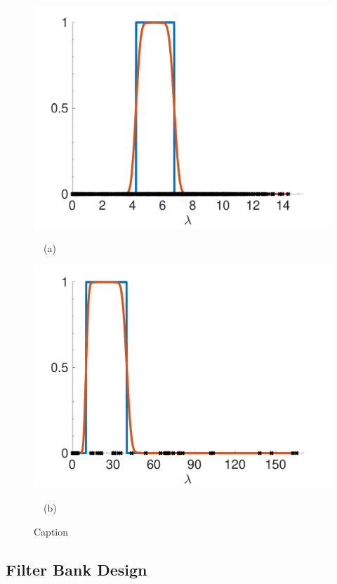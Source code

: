 \documentclass[journal, 10pt]{IEEEtran}
\begin{document}
{\begin{figure}[tbh]
\begin{minipage}[m]{0.49\linewidth}
\centerline{\includegraphics[width=1.15\linewidth]{fig_approx_filter_sensor}}
\centerline{~~\small{(a)}}
\end{minipage}
\begin{minipage}[m]{0.49\linewidth}
\centerline{\includegraphics[width=1.15\linewidth]{fig_approx_filter_net25}}
\centerline{~~\small{(b)}}
\end{minipage} 
\caption{Caption}\label{Fig:approx_filtering_error}
\end{figure}

\subsection{Filter Bank Design}


}
\end{document}
